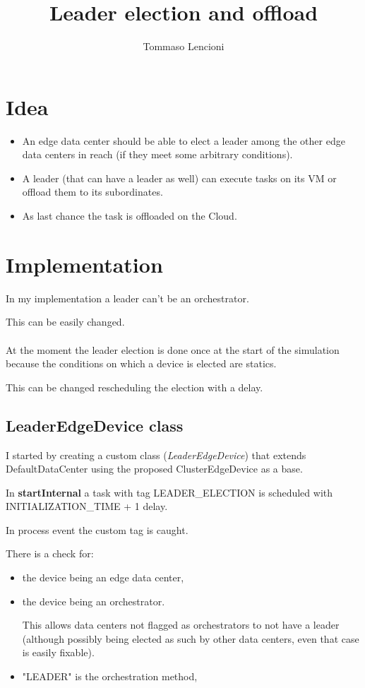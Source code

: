 \documentclass[12pt, a4paper]{report} %
\title{Leader election and offload}
\author{Tommaso Lencioni}
\begin{document}
\section*{Idea}
\begin{itemize}
	\item An edge data center should be able to elect a leader among the other edge data centers in reach (if they meet some arbitrary conditions).
	\item A leader (that can have a leader as well) can execute tasks on its VM or offload them to its subordinates.
	\item As last chance the task is offloaded on the Cloud.
\end{itemize}

\section*{Implementation}
In my implementation a leader can't be an orchestrator.

This can be easily changed.
\\
\\
At the moment the leader election is done once at the start of the simulation because the conditions on which a device is elected are statics.

This can be changed rescheduling the election with a delay.

\subsection*{LeaderEdgeDevice class}
I started by creating a custom class (\textit{LeaderEdgeDevice}) that extends DefaultDataCenter using the proposed ClusterEdgeDevice as a base.

In \textbf{startInternal} a task with tag LEADER\_ELECTION is scheduled with INITIALIZATION\_TIME + 1 delay.

In process event the custom tag is caught.

There is a check for:
 	\begin{itemize}
 		\item the device being an edge data center,
 		\item the device being an orchestrator.
 		
 		This allows data centers not flagged as orchestrators to not have a leader (although possibly being elected as such by other data centers, even that case is easily fixable).
 		\item "LEADER" is the orchestration method,
  	\end{itemize}
\end{document}
